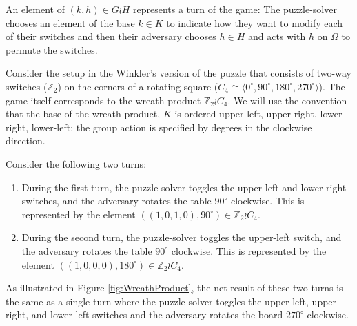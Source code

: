 An element of $(k, h) \in G \wr H$ represents a turn of the game:
The puzzle-solver chooses an element of the base $k \in K$ to indicate
how they want to modify each of their switches
and then their adversary chooses $h \in H$ and acts with $h$ on $\Omega$ to
permute the switches.

\begin{example}
  Consider the setup in the Winkler's version of the puzzle that consists of
  two-way switches ($\mathbb Z_2$) on the corners of a rotating square
  ($C_4 \cong \langle 0^\circ, 90^\circ, 180^\circ, 270^\circ \rangle$).
  The game itself corresponds to the wreath product $\mathbb Z_2 \wr C_4$.
  We will use the convention that the base of the wreath product, $K$ is
  ordered upper-left, upper-right, lower-right, lower-left; the group
  action is specified by degrees in the clockwise direction.

  Consider the following two turns:
  \begin{enumerate}
    \item During the first turn,
    the puzzle-solver toggles the upper-left and lower-right switches, and
    the adversary rotates the table $90^\circ$ clockwise.
    This is represented by the element
    $((1,0,1,0), 90^\circ) \in \mathbb Z_2 \wr C_4$.
    \item During the second turn,
    the puzzle-solver toggles the upper-left switch, and
    the adversary rotates the table $90^\circ$ clockwise.
    This is represented by the element
    $((1,0,0,0), 180^\circ) \in \mathbb Z_2 \wr C_4$.
  \end{enumerate}
  As illustrated in Figure \ref{fig:WreathProduct},
  the net result of these two turns is the same as
  a single turn where the puzzle-solver toggles the
  upper-left, upper-right, and lower-left
  switches and the adversary rotates the board $270^\circ$ clockwise.

  \begin{figure}
    \center
\end{figure}
\end{example}
